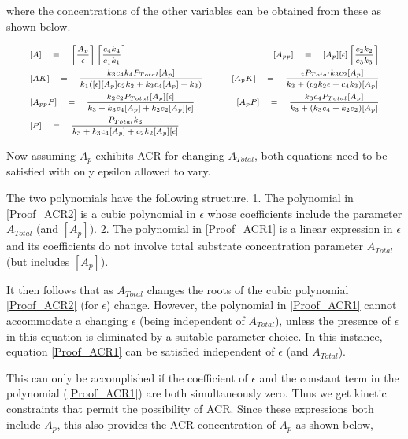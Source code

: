 \documentclass[9pt,lineno]{elife}
\begin{document}
\begin{appendixbox}
where the concentrations of the other variables can be obtained from these as shown below. 

\begin{equation}
    \scriptsize{
    \begin{aligned}
        & [A] \quad = \quad \left[\frac{A_p}{\epsilon}\right] \left[\frac{c_4k_4}{c_1k_1}\right] \qquad
        & [A_{pp}] \quad = \quad [A_p] [\epsilon] \left[ \frac{c_2k_2}{c_3k_3}\right] \\
        & [AK] \quad = \quad \frac{k_3c_4k_4P_{Total}[A_p]}{k_1([\epsilon] [A_p] c_2k_2 + k_3c_4[A_p] + k_3)} \qquad
        & [A_pK] \quad = \quad \frac{\epsilon P_{Total}k_3c_2[A_p]}{k_3+(c_2k_2\epsilon + c_4k_3)[A_p]}  \\
        & [A_{pp}P] \quad = \quad \frac{k_2c_2P_{Total}[A_p] [\epsilon]}{k_3 + k_3c_4[A_p] + k_2c_2[A_p][\epsilon]} \qquad
        & [A_pP] \quad = \quad \frac{k_3c_4P_{Total}[A_p]}{k_3 + (k_3c_4+k_2c_2)[A_p]} \\
        & [P] \quad = \quad \frac{P_{Total}k_3}{k_3 + k_3c_4[A_p] + c_2k_2[A_p][\epsilon]}
    \end{aligned} }
\end{equation}

Now assuming $A_p$ exhibits ACR for changing $A_{Total}$, both equations need to be satisfied with only epsilon allowed to vary. 

The two polynomials have the following structure. 1. The polynomial in \cref{Proof_ACR2} is a cubic polynomial in $\epsilon$ whose coefficients include the parameter $A_{Total}$ (and $[A_p]$). 2. The polynomial in \cref{Proof_ACR1} is a linear expression in $\epsilon$ and its coefficients do not involve total substrate concentration parameter $A_{Total}$ (but includes $[A_p]$).

It then follows that as $A_{Total}$ changes the roots of the cubic polynomial \cref{Proof_ACR2} (for $\epsilon$) change. However, the polynomial in \cref{Proof_ACR1} cannot accommodate a changing $\epsilon$ (being independent of $A_{Total}$), unless the presence of $\epsilon$ in this equation is eliminated by a suitable parameter choice. In this instance, equation \cref{Proof_ACR1} can be satisfied independent of $\epsilon$ (and $A_{Total}$).

This can only be accomplished if the coefficient of $\epsilon$ and the constant term in the polynomial (\cref{Proof_ACR1}) are both simultaneously zero. Thus we get kinetic constraints that permit the possibility of ACR. Since these expressions both include $A_p$, this also provides the ACR concentration of $A_p$ as shown below, 


\end{appendixbox}
\end{document}
